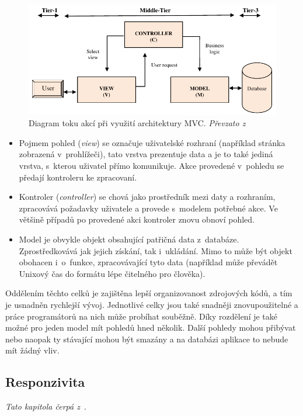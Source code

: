 \begin{figure}[H]
	\centering
	\includegraphics[width=\textwidth]{obrazky-figures/mvc.pdf}
	\caption{Diagram toku akcí při využití architektury MVC. \emph{Převzato z~\cite{bib:mvc}}}
	\label{img:mvc}
\end{figure}

\begin{itemize}
\item Pojmem pohled (\emph{view}) se označuje uživatelské rozhraní (například stránka zobrazená v~prohlížeči), tato vrstva prezentuje data a je to také jediná vrstva, s~kterou uživatel přímo komunikuje. Akce provedené v~pohledu se předají kontroleru ke zpracovaní.
\item Kontroler (\emph{controller}) se chová jako prostředník mezi daty a rozhraním, zpracovává požadavky uživatele a provede s~modelem potřebné akce. Ve většině případů po provedené akci kontroler znovu obnoví pohled.
\item Model je obvykle objekt obsahující patřičná data z~databáze. Zprostředkovává jak jejich získání, tak i~ukládání. Mimo to může být objekt obohacen i~o~funkce, zpracovávající tyto data (například může převádět Unixový čas do formátu lépe čitelného pro člověka). 
\end{itemize}


Oddělením těchto celků je zajištěna lepší organizovanost zdrojových kódů, a tím je usnadněn rychlejší vývoj. Jednotlivé celky jsou také snadněji znovupoužitelné a práce programátorů na nich může probíhat souběžně. Díky rozdělení je také možné pro jeden model mít pohledů hned několik. Další pohledy mohou přibývat nebo naopak ty stávající mohou být smazány a na databázi aplikace to nebude mít žádný vliv.


\subsection{Responzivita}\label{section:responsive}
\emph{Tato kapitola čerpá z~\cite{bib:responsive}}.

